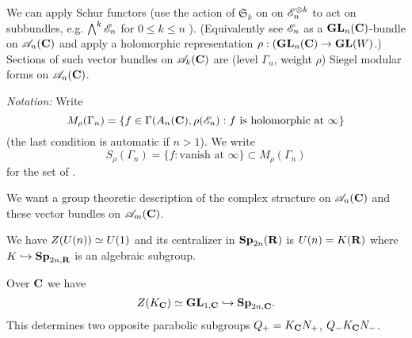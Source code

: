 We can apply Schur functors (use the action of $\mathfrak{S}_k$ on on $\mathscr{E}_n^{\otimes k}$
to act on subbundles, e.g. $\bigwedge^{k}\mathscr{E}_n$ for $0\le k\le n$ ). (Equivalently see
$\mathscr{E}_n$ as a $\mathbf{GL}_n(\mathbf{C})$-bundle on $\mathscr{A}_n(\mathbf{C})$ and apply a holomorphic representation
$\rho:(\GL_n(\C)\to \GL(W)$.)
Sections of such vector bundles on $\mathscr{A}_k(\mathbf{C})$ are (level $\Gamma_n$, weight $\rho$)
Siegel modular forms on $\mathscr{A}_n(\mathbf{C})$.

\emph{Notation:} Write
\[
M_\rho(\Gamma_n) = \left\{ f\in \Gamma(A_n(\mathbf{C}),\rho(\mathscr{E}_n):f\text{ is holomorphic at
	}\infty \right\}
\]
(the last condition is automatic if $n>1$). We write
\[
	S_\rho(\Gamma_n) = \{f:\text{vanish at }\infty\} \subset M_\rho(\Gamma_n)
\]
for the set of .

We want a group theoretic description of the complex structure on $\mathscr{A}_n(\mathbf{C})$ and these
vector bundles on $\mathscr{A}_m(\mathbf{C})$.

We have $Z(U(n))\simeq U(1)$ and its centralizer in $\mathbf{Sp}_{2n}(\mathbf{R})$ is $U(n)=K(\mathbf{R})$ where
$K\hookrightarrow \mathbf{Sp}_{2n,\mathbf{R}}$ is an algebraic subgroup.

Over $\mathbf{C}$ we have
\[
	Z(K_{\mathbf{C}}) \simeq \mathbf{GL}_{1,\mathbf{C}} \hookrightarrow \mathbf{Sp}_{2n,\mathbf{C}}.
\]
This determines two opposite parabolic subgroups $Q_+=K_{\mathbf{C}}N_+$, $Q_{-}K_{\mathbf{C}}N_-$.

